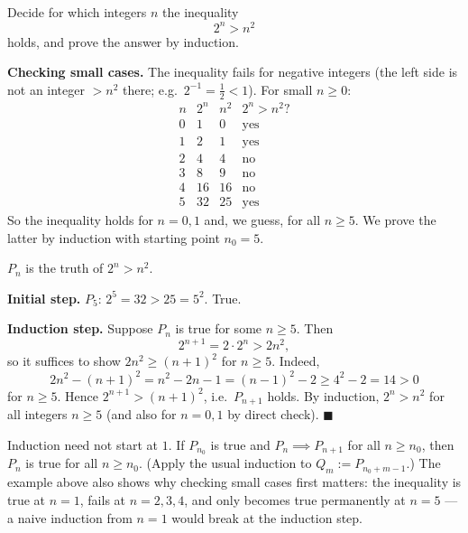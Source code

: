 \documentclass[11pt]{report}
\begin{document}
\begin{exbox}
Decide for which integers $n$ the inequality
\[
2^n > n^2
\]
holds, and prove the answer by induction.

\textbf{Checking small cases.} The inequality fails for negative integers (the left side is not an integer $> n^2$ there; e.g.\ $2^{-1} = \tfrac12 < 1$). For small $n \geq 0$:
\[
\begin{array}{c|c|c|c}
n & 2^n & n^2 & 2^n > n^2? \\ \hline
0 & 1 & 0 & \text{yes} \\
1 & 2 & 1 & \text{yes} \\
2 & 4 & 4 & \text{no} \\
3 & 8 & 9 & \text{no} \\
4 & 16 & 16 & \text{no} \\
5 & 32 & 25 & \text{yes}
\end{array}
\]
So the inequality holds for $n = 0, 1$ and, we guess, for all $n \geq 5$. We prove the latter by induction with starting point $n_0 = 5$.

$P_n$ is the truth of $2^n > n^2$.

\textbf{Initial step.} $P_5$: $2^5 = 32 > 25 = 5^2$. True.

\textbf{Induction step.} Suppose $P_n$ is true for some $n \geq 5$. Then
\[
2^{n+1} = 2 \cdot 2^n > 2n^2,
\]
so it suffices to show $2n^2 \geq (n+1)^2$ for $n \geq 5$. Indeed,
\[
2n^2 - (n+1)^2 = n^2 - 2n - 1 = (n-1)^2 - 2 \geq 4^2 - 2 = 14 > 0
\]
for $n \geq 5$. Hence $2^{n+1} > (n+1)^2$, i.e.\ $P_{n+1}$ holds. By induction, $2^n > n^2$ for all integers $n \geq 5$ (and also for $n = 0, 1$ by direct check). \hfill $\blacksquare$
\end{exbox}

\begin{rembox}
Induction need not start at $1$. If $P_{n_0}$ is true and $P_n \implies P_{n+1}$ for all $n \geq n_0$, then $P_n$ is true for all $n \geq n_0$. (Apply the usual induction to $Q_m := P_{n_0 + m - 1}$.) The example above also shows why checking small cases first matters: the inequality is true at $n=1$, fails at $n = 2,3,4$, and only becomes true permanently at $n = 5$ --- a naive induction from $n=1$ would break at the induction step.
\end{rembox}

\end{document}
